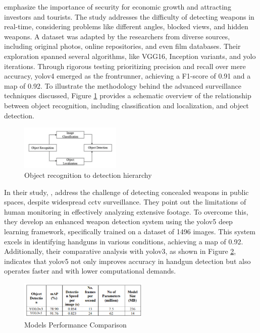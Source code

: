 \citet{rfc4} emphasize the importance of security for economic growth and attracting investors and tourists. The study addresses the difficulty of detecting weapons in real-time, considering problems like different angles, blocked views, and hidden weapons. A dataset was adapted by the researchers from diverse sources, including original photos, online repositories, and even film databases. Their exploration spanned several algorithms, like VGG16, Inception variants, and \ac{yolo} iterations. Through rigorous testing prioritizing precision and recall over mere accuracy, \ac{yolo}v4 emerged as the frontrunner, achieving a F1-score of 0.91 and a \ac{map} of 0.92. To illustrate the methodology behind the advanced surveillance techniques discussed, Figure \ref{fig:bhatti-chart} provides a schematic overview of the relationship between object recognition, including classification and localization, and object detection.

\begin{figure}[ht]
    \centering 
    \includegraphics[width=0.43\textwidth]{figs/bhatti-chart.png} 
    \caption{Object recognition to detection hierarchy \cite{rfc4}}
    \label{fig:bhatti-chart}
\end{figure}

In their study, \citet{rfc5}, address the challenge of detecting concealed weapons in public spaces, despite widespread \ac{cctv} surveillance. They point out the limitations of human monitoring in effectively analyzing extensive footage. To overcome this, they develop an enhanced weapon detection system using the \ac{yolo}v5 deep learning framework, specifically trained on a dataset of 1496 images. This system excels in identifying handguns in various conditions, achieving a \ac{map} of 0.92. Additionally, their comparative analysis with \ac{yolo}v3, as shown in Figure \ref{fig:performance-Thangaraj}, indicates that \ac{yolo}v5 not only improves accuracy in handgun detection but also operates faster and with lower computational demands.

\begin{figure}[h]
    \centering 
    \includegraphics[width=0.55\textwidth]{figs/performance-Thangaraj.png} 
    \caption{Models Performance Comparison \cite{rfc5}}
    \label{fig:performance-Thangaraj}
\end{figure}

